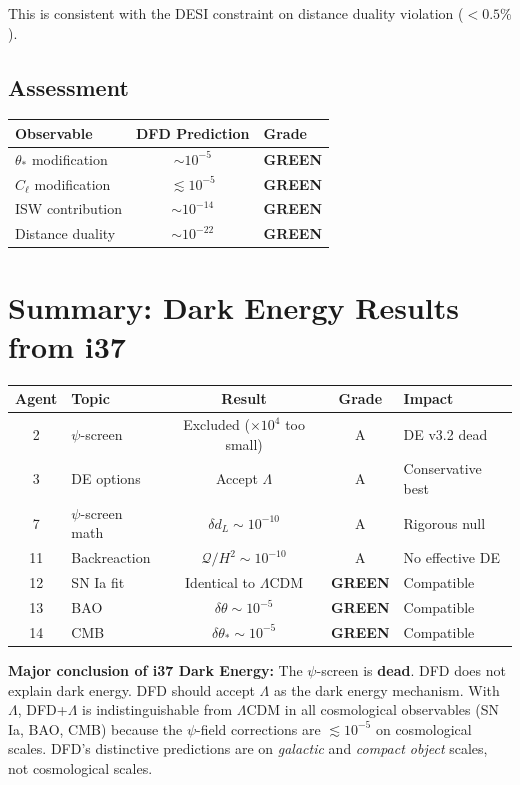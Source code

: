 \documentclass[11pt,a4paper]{article}
\newcommand{\GREEN}{\textcolor{dfdgreen}{\textbf{GREEN}}}
\begin{document}
This is consistent with the DESI constraint on distance duality violation ($< 0.5\%$).

\subsection{Assessment}

\begin{center}
\begin{tabular}{lcl}
\toprule
\textbf{Observable} & \textbf{DFD Prediction} & \textbf{Grade} \\
\midrule
$\theta_*$ modification & $\sim 10^{-5}$ & \GREEN \\
$C_\ell$ modification & $\lesssim 10^{-5}$ & \GREEN \\
ISW contribution & $\sim 10^{-14}$ & \GREEN \\
Distance duality & $\sim 10^{-22}$ & \GREEN \\
\bottomrule
\end{tabular}
\end{center}

\newpage
\section{Summary: Dark Energy Results from i37}
\label{sec:summary-de}

\begin{center}
\begin{tabular}{clccl}
\toprule
\textbf{Agent} & \textbf{Topic} & \textbf{Result} & \textbf{Grade} & \textbf{Impact} \\
\midrule
2 & $\psi$-screen & Excluded ($\times 10^4$ too small) & A & DE v3.2 dead \\
3 & DE options & Accept $\Lambda$ & A & Conservative best \\
7 & $\psi$-screen math & $\delta d_L \sim 10^{-10}$ & A & Rigorous null \\
11 & Backreaction & $\mathcal{Q}/H^2 \sim 10^{-10}$ & A & No effective DE \\
12 & SN Ia fit & Identical to $\Lambda$CDM & \GREEN & Compatible \\
13 & BAO & $\delta\theta \sim 10^{-5}$ & \GREEN & Compatible \\
14 & CMB & $\delta\theta_* \sim 10^{-5}$ & \GREEN & Compatible \\
\bottomrule
\end{tabular}
\end{center}

\textbf{Major conclusion of i37 Dark Energy:} The $\psi$-screen is \textbf{dead}. DFD does not explain dark energy. DFD should accept $\Lambda$ as the dark energy mechanism. With $\Lambda$, DFD+$\Lambda$ is indistinguishable from $\Lambda$CDM in all cosmological observables (SN Ia, BAO, CMB) because the $\psi$-field corrections are $\lesssim 10^{-5}$ on cosmological scales. DFD's distinctive predictions are on \emph{galactic} and \emph{compact object} scales, not cosmological scales.
\end{document}
